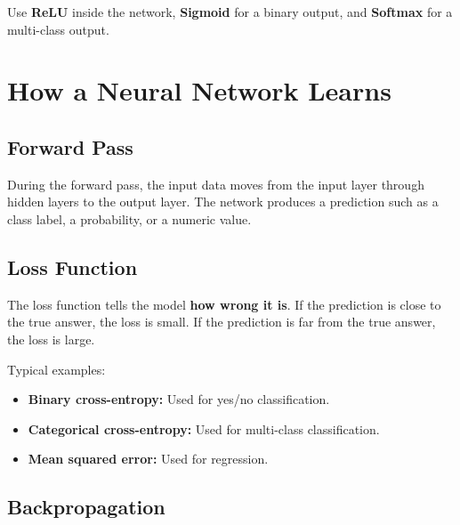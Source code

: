 \documentclass[11pt,a4paper]{article}
\begin{document}
\begin{conceptbox}
Use \textbf{ReLU} inside the network, \textbf{Sigmoid} for a binary output, and \textbf{Softmax} for a multi-class output.
\end{conceptbox}

\section{How a Neural Network Learns}

\subsection{Forward Pass}

\begin{definitionbox}
During the forward pass, the input data moves from the input layer through hidden layers to the output layer. The network produces a prediction such as a class label, a probability, or a numeric value.
\end{definitionbox}

\subsection{Loss Function}

\begin{conceptbox}[Loss = Prediction Error]
The loss function tells the model \textbf{how wrong it is}. If the prediction is close to the true answer, the loss is small. If the prediction is far from the true answer, the loss is large.
\end{conceptbox}

Typical examples:
\begin{itemize}[leftmargin=*]
  \item \textbf{Binary cross-entropy:} Used for yes/no classification.
  \item \textbf{Categorical cross-entropy:} Used for multi-class classification.
  \item \textbf{Mean squared error:} Used for regression.
\end{itemize}

\subsection{Backpropagation}
\end{document}
